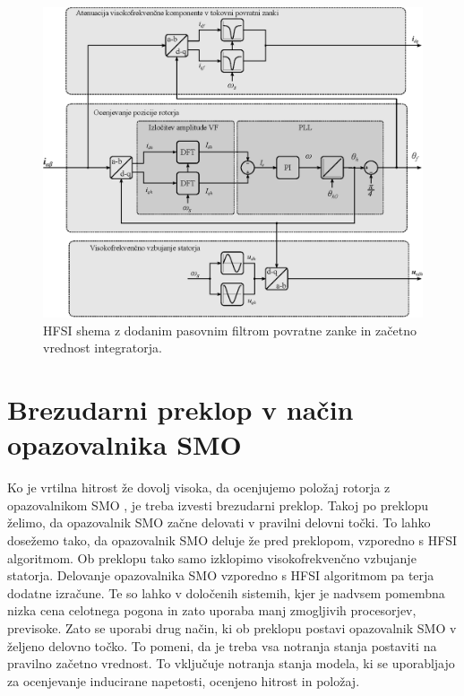 \documentclass[a4paper,twoside,openright,12pt,slovene]{book}
\begin{document}
\begin{figure}[!htbp]
    \centering
    \includegraphics[width=0.95\columnwidth]{Slike/Inkscape/HFSI.eps}
    \caption{\label{HFSI} HFSI shema z dodanim pasovnim filtrom povratne zanke in začetno vrednost integratorja. }
\end{figure}

\newpage

\section{Brezudarni preklop v način opazovalnika SMO}


Ko je vrtilna hitrost že dovolj visoka, da ocenjujemo položaj rotorja z opazovalnikom SMO \cite{9400421}, je treba izvesti brezudarni preklop. Takoj po preklopu želimo, da opazovalnik SMO začne
delovati v pravilni delovni točki. To lahko dosežemo tako, da opazovalnik SMO deluje že pred preklopom, vzporedno s HFSI algoritmom. Ob preklopu tako samo izklopimo visokofrekvenčno vzbujanje
statorja. Delovanje opazovalnika SMO vzporedno s HFSI algoritmom pa terja dodatne izračune. Te so lahko v določenih sistemih, kjer je nadvsem pomembna nizka cena celotnega pogona in zato uporaba
manj zmogljivih procesorjev, previsoke. Zato se uporabi drug način, ki ob preklopu postavi opazovalnik SMO v željeno delovno točko. To pomeni, da je treba vsa notranja stanja postaviti na pravilno
začetno vrednost. To vključuje notranja stanja modela, ki se uporabljajo za ocenjevanje inducirane napetosti, ocenjeno hitrost in položaj.
\end{document}
